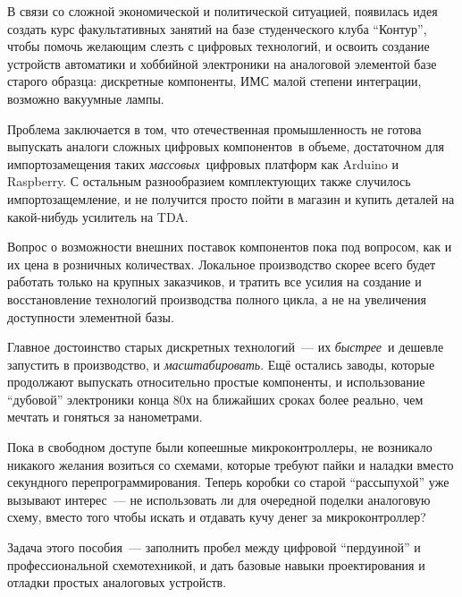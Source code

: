 \clearpage
{}

В связи со сложной экономической и политической ситуацией, появилась идея
создать курс факультативных занятий на базе студенческого клуба ``Контур'',
чтобы помочь желающим слезть с цифровых технологий, и освоить создание устройств
автоматики и хоббийной электроники на аналоговой элементой базе старого образца:
дискретные компоненты, ИМС малой степени интеграции, возможно вакуумные
лампы.

Проблема заключается в том, что отечественная промышленность не готова выпускать
аналоги сложных цифровых компонентов\
в объеме, достаточном для импортозамещения таких \emph{массовых}\ цифровых
платформ как Arduino и Raspberry. С остальным разнообразием комплектующих также
случилось импортозащемление, и не получится просто пойти в магазин и купить
деталей на какой-нибудь усилитель на TDA.

Вопрос о возможности внешних поставок компонентов пока под вопросом, как и их
цена в розничных количествах. Локальное производство скорее всего будет работать
только на крупных заказчиков\note{космос, военка, промышленная автоматика}, и
тратить все усилия на создание и восстановление технологий производства полного
цикла, а не на увеличения доступности элементной базы.

Главное достоинство старых дискретных технологий\ --- их \emph{быстрее}\ и
дешевле запустить в производство, и \emph{масштабировать}. Ещё остались заводы,
которые продолжают выпускать относительно простые компоненты, и использование
``дубовой'' электроники конца 80х на ближайших сроках более реально, чем мечтать
и гоняться за нанометрами.

Пока в свободном доступе были копеешные микроконтроллеры, не возникало никакого
желания возиться со схемами, которые требуют пайки и наладки вместо секундного
перепрограммирования. Теперь коробки со старой ``рассыпухой'' уже вызывают
интерес\ --- не использовать ли для очередной поделки аналоговую схему, вместо
того чтобы искать и отдавать кучу денег за микроконтроллер?

Задача этого пособия\ --- заполнить пробел между цифровой ``пердуиной'' и
профессиональной схемотехникой, и дать базовые навыки проектирования и отладки
простых аналоговых устройств.
